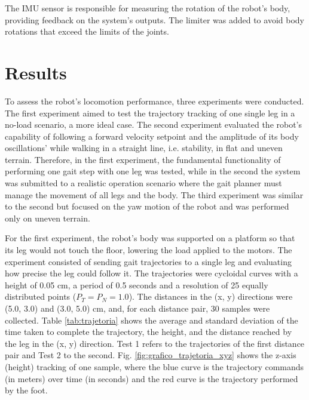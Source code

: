 \documentclass[conference]{IEEEtran}
\begin{document}
The IMU sensor is responsible for measuring the rotation of the robot's body, providing feedback on the system's outputs. The limiter was added to avoid body rotations that exceed the limits of the joints.

\section{Results} \label{results}

To assess the robot's locomotion performance, three experiments were conducted. The first experiment aimed to test the trajectory tracking of one single leg in a no-load scenario, a more ideal case. The second experiment evaluated the robot's capability of following a forward velocity setpoint and the amplitude of its body oscillations' while walking in a straight line, i.e. stability, in flat and uneven terrain. Therefore, in the first experiment, the fundamental functionality of performing one gait step with one leg was tested, while in the second the system was submitted to a realistic operation scenario where the gait planner must manage the movement of all legs and the body. The third experiment was similar to the second but focused on the yaw motion of the robot and was performed only on uneven terrain.

For the first experiment, the robot's body was supported on a platform so that its leg would not touch the floor, lowering the load applied to the motors. The experiment consisted of sending gait trajectories to a single leg and evaluating how precise the leg could follow it. The trajectories were cycloidal curves with a height of 0.05 cm, a period of 0.5 seconds and a resolution of 25 equally distributed points ($P_T = P_N = 1.0$). The distances in the (x, y) directions were (5.0, 3.0) and (3.0, 5.0) cm, and, for each distance pair, 30 samples were collected. Table \ref{tab:trajetoria} shows the average and standard deviation of the time taken to complete the trajectory, the height, and the distance reached by the leg in the (x, y) direction. Test 1 refers to the trajectories of the first distance pair and Test 2 to the second. Fig. \ref{fig:grafico_trajetoria_xyz} shows the z-axis (height) tracking of one sample, where the blue curve is the trajectory commands (in meters) over time (in seconds) and the red curve is the trajectory performed by the foot.
\end{document}
